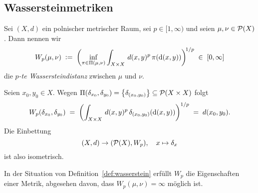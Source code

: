 \documentclass[../main/main.tex]{subfiles}
\begin{document}
	\subsection{Wassersteinmetriken}

	\begin{Definition}
		\label{def:wasserstein}
		Sei $(X, d)$ ein polnischer metrischer Raum, sei $p \in [1, \infty)$ und seien $\mu, \nu \in \mathcal{P}(X)$. Dann nennen wir
		$$ W_p(\mu, \nu) \; \vcentcolon = \; \left(\inf_{\pi \in \Pi(\mu, \nu)} \int_{X \times X} \, d(x, y)^p \, \pi(\mathrm{d}(x, y))\right)^{\! 1/p} \; \in \; [0, \infty] $$
		die \emph{$p$-te Wassersteindistanz} zwischen $\mu$ und $\nu$.
	\end{Definition}

	\begin{Bemerkung}
		Seien $x_0, y_0 \in X$. Wegen $\Pi(\delta_{x_0}, \delta_{y_0}) = \left\{\delta_{(x_0, y_0)}\right\} \subseteq \mathcal{P}(X \times X)$ folgt
		\[ W_p(\delta_{x_0}, \delta_{y_0}) \; = \; \left( \int_{X \times X} \, d(x, y)^p \, \delta_{(x_0, y_0)}(\mathrm{d}(x, y)) \right)^{1/p} \; = \; d(x_0, y_0) \text{.} \]
		Die Einbettung 
		\[ (X, d) \to (\mathcal{P}(X), W_p), \quad x \mapsto \delta_x \]
		ist also isometrisch.
	\end{Bemerkung}

	\begin{Satz}
		\label{thm:wassersteinismetric}
		In der Situation von Definition~\ref{def:wasserstein} erfüllt $W_p$ die Eigenschaften einer Metrik, abgesehen davon, dass $W_p(\mu, \nu) = \infty$ möglich ist.
	\end{Satz}
\end{document}

